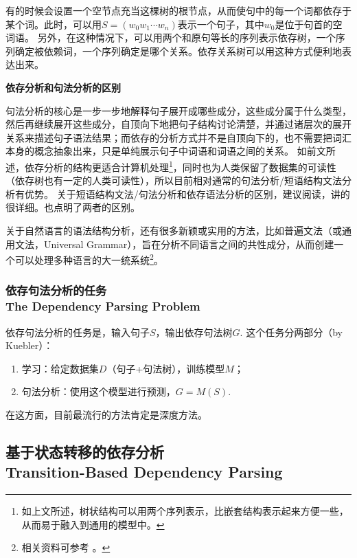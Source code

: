 有的时候会设置一个空节点充当这棵树的根节点，从而使句中的每一个词都依存于某个词。此时，可以用$S = (w_0w_1\cdots w_n)$表示一个句子，其中$w_0$是位于句首的空词语。
另外，在这种情况下，可以用两个和原句等长的序列表示依存树，一个序列确定被依赖词，一个序列确定是哪个关系。依存关系树可以用这种方式便利地表达出来。

\textbf{依存分析和句法分析的区别}

句法分析的核心是一步一步地解释句子展开成哪些成分，这些成分属于什么类型，然后再继续展开这些成分，自顶向下地把句子结构讨论清楚，并通过诸层次的展开关系来描述句子语法结果；而依存的分析方式并不是自顶向下的，也不需要把词汇本身的概念抽象出来，只是单纯展示句子中词语和词语之间的关系。
如前文所述，依存分析的结构更适合计算机处理\footnote{如上文所述，树状结构可以用两个序列表示，比嵌套结构表示起来方便一些，从而易于融入到通用的模型中。}，同时也为人类保留了数据集的可读性（依存树也有一定的人类可读性），所以目前相对通常的句法分析/短语结构文法分析有优势。
关于短语结构文法/句法分析和依存语法分析的区别，建议阅读\cite{04-cnblogs2}，讲的很详细。\cite{04-blog1}也点明了两者的区别。

关于自然语言的语法结构分析，还有很多新颖或实用的方法，比如普遍文法（或通用文法，Universal Grammar），旨在分析不同语言之间的共性成分，从而创建一个可以处理多种语言的大一统系统\footnote{相关资料可参考 \cite{04-uni1, 04-uni2, 04-uni3, 04-uni4}。}。

\subsubsection{依存句法分析的任务 \\ The Dependency Parsing Problem}

依存句法分析的任务是，输入句子$S$，输出依存句法树$G$. 这个任务分两部分（by Kuebler）：

\begin{enumerate}
    \item 学习：给定数据集$D$（句子+句法树），训练模型$M$；
    \item 句法分析：使用这个模型进行预测，$G = M(S)$.
\end{enumerate}

在这方面，目前最流行的方法肯定是深度方法。

\subsection{基于状态转移的依存分析 \\ Transition-Based Dependency Parsing}


